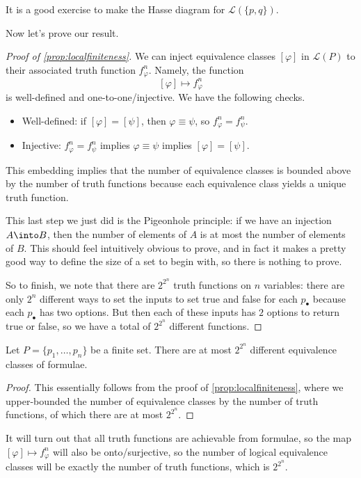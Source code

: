 It is a good exercise to make the Hasse diagram for $\mathcal L(\{p,q\})$.

Now let's prove our result.
\begin{proof}[Proof of \autoref{prop:localfiniteness}]
	We can inject equivalence classes $[\varphi]$ in $\mathcal L(P)$ to their associated truth function $f_\varphi^n$. Namely, the function
	\[[\varphi]\mapsto f_\varphi^n\]
	is well-defined and one-to-one/injective. We have the following checks.
	\begin{itemize}
		\item Well-defined: if $[\varphi]=[\psi]$, then $\varphi\equiv\psi$, so $f_\varphi^n=f_\psi^n$.
		\item Injective: $f_\varphi^n=f_\psi^n$ implies $\varphi\equiv\psi$ implies $[\varphi]=[\psi]$.
	\end{itemize}
	This embedding implies that the number of equivalence classes is bounded above by the number of truth functions because each equivalence class yields a unique truth function.
	\begin{remark}
		This last step we just did is the Pigeonhole principle: if we have an injection $A\into B$, then the number of elements of $A$ is at most the number of elements of $B$. This should feel intuitively obvious to prove, and in fact it makes a pretty good way to define the size of a set to begin with, so there is nothing to prove.
	\end{remark}
	So to finish, we note that there are $2^{2^n}$ truth functions on $n$ variables: there are only $2^n$ different ways to set the inputs to set true and false for each $p_\bullet$ because each $p_\bullet$ has two options. But then each of these inputs has $2$ options to return true or false, so we have a total of $2^{2^n}$ different functions.
\end{proof}
\begin{corollary}
	Let $P=\{p_1,\ldots,p_n\}$ be a finite set. There are at most $2^{2^n}$ different equivalence classes of formulae.
\end{corollary}
\begin{proof}
	This essentially follows from the proof of \autoref{prop:localfiniteness}, where we upper-bounded the number of equivalence classes by the number of truth functions, of which there are at most $2^{2^n}$.
\end{proof}
\begin{remark} \label{rem:completeness}
	It will turn out that all truth functions are achievable from formulae, so the map $[\varphi]\mapsto f_\varphi^n$ will also be onto/surjective, so the number of logical equivalence classes will be exactly the number of truth functions, which is $2^{2^n}$.
\end{remark}

